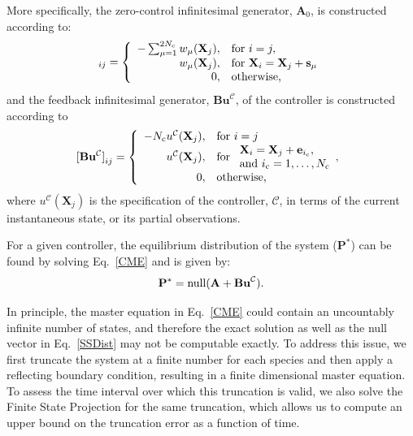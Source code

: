 \documentclass[12pt]{iopart}
\begin{document}
More specifically, the zero-control infinitesimal generator, $\mathbf{A}_0$, is constructed according to:
\begin{equation}
[\mathbf{A}_0]_{ij} = \left\{
\begin{array}{rl}
-\sum_{\mu =1}^{2N_{\rm c}} w_{\mu}(\mathbf{X}_j), &\textrm{for }i=j,\\
w_{\mu}(\mathbf{X}_j), &\textrm{for }\mathbf{X}_i = \mathbf{X}_j+\mathbf{s}_\mu\\
0, & \textrm{otherwise,}
\end{array}\right. 
\label{InfA}
\end{equation}
and the feedback infinitesimal generator, $\mathbf{Bu}^{\mathcal{C}}$, of the controller is constructed according to
\begin{equation}
[\mathbf{Bu^{\mathcal{C}}]}_{ij} = \left\{
\begin{array}{rl}
- N_{\rm c}{u}^{\mathcal{C}}(\mathbf{X}_j), &\textrm{for }i=j\\
{u}^{\mathcal{C}}(\mathbf{X}_j), &\textrm{for }\begin{array}{ll}\mathbf{X}_i =\mathbf{X}_j + \mathbf{e}_{i_{\rm c}}, \\ \textrm{and } i_{\rm c} = 1,\ldots,N_{\rm c}\end{array},\\
0, & \textrm{otherwise,}
\end{array}\right.
\label{InfB}
\end{equation}
where ${u}^{\mathcal{C}}(\mathbf{X}_j)$ is the specification of the controller, $\mathcal{C}$, in terms of the current instantaneous state, or its partial observations.

For a given controller, the equilibrium distribution of the system ($\mathbf{P}^*$) can be found by solving Eq.\ \ref{CME} and is given by:
\begin{equation}
\mathbf{P}^*={\rm null}(\mathbf{A}+\textbf{Bu}^{\mathcal{C}}).\label{SSDist}
\end{equation}

In principle, the master equation in Eq.\ \ref{CME} could contain an uncountably infinite number of states, and therefore the exact solution as well as the null vector in Eq.\ \ref{SSDist} may not be computable exactly.  To address this issue, we first truncate the system at a finite number for each species and then apply a reflecting boundary condition, resulting in a finite dimensional master equation. To assess the time interval over which this truncation is valid, we also solve the Finite State Projection \cite{Munsky2006} for the same truncation, which allows us to compute an upper bound on the truncation error as a function of time. 
\end{document}
